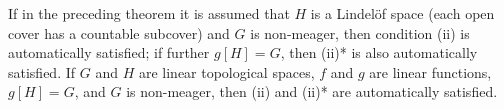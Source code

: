 If in the preceding theorem it is assumed that $H$ is a Lindel\"of space (each open cover has a countable subcover) and $G$ is non-meager, then condition (ii) is automatically satisfied; if further $g[H] = G$, then (ii)* is also automatically satisfied. If $G$ and $H$ are linear topological spaces, $f$ and $g$ are linear functions, $g[H] = G$, and $G$ is non-meager, then (ii) and (ii)* are automatically satisfied.
